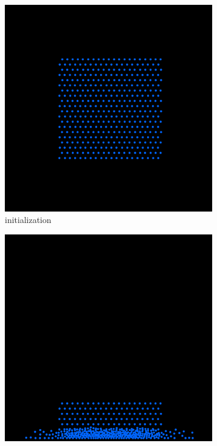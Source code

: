 \begin{figure}[h]
    \centering
    \begin{subfigure}[b]{0.2\textwidth}
        \includegraphics[width=\textwidth]{figures/particle400_1.png}
        \caption{initialization}
    \end{subfigure}
    \hspace{1em}
    \begin{subfigure}[b]{0.2\textwidth}
        \includegraphics[width=\textwidth]{figures/particle400_2.png}

\end{subfigure}
\end{figure}
